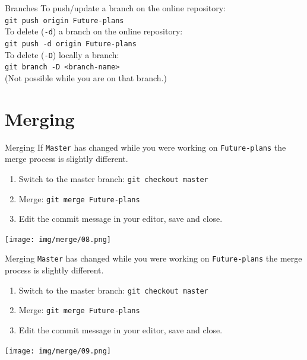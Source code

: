 \documentclass[usenames,dvipsnames,9pt]{beamer}
\begin{document}
%
\begin{frame}{Branches}
  \centering
  To push/update a branch on the online repository:\\
  \lstinline|git push origin Future-plans|\\
  \vspace{1cm}
  To delete (\lstinline|-d|) a branch on the online repository:\\
  \lstinline|git push -d origin Future-plans|\\
  \vspace{1cm}
  To delete (\lstinline|-D|) locally a branch:\\
  \lstinline|git branch -D <branch-name>|\\
  (Not possible while you are on that branch.)
\end{frame}



%
%
\section{Merging}

%
\begin{frame}{Merging}
  If \texttt{Master} has changed while you were working on \texttt{Future-plans} the merge process is slightly different.
  \begin{enumerate}
    \item Switch to the master branch: \lstinline|git checkout master|
    \item Merge: \lstinline|git merge Future-plans|
    \item Edit the commit message in your editor, save and close.
  \end{enumerate}
  \texttt{[image: img/merge/08.png]}
\end{frame}

%
\begin{frame}{Merging}
  \texttt{Master} has changed while you were working on \texttt{Future-plans} the merge process is slightly different.
  \begin{enumerate}
    \item Switch to the master branch: \lstinline|git checkout master|
    \item Merge: \lstinline|git merge Future-plans|
    \item Edit the commit message in your editor, save and close.
  \end{enumerate}
  \texttt{[image: img/merge/09.png]}
\end{frame}
\end{document}
